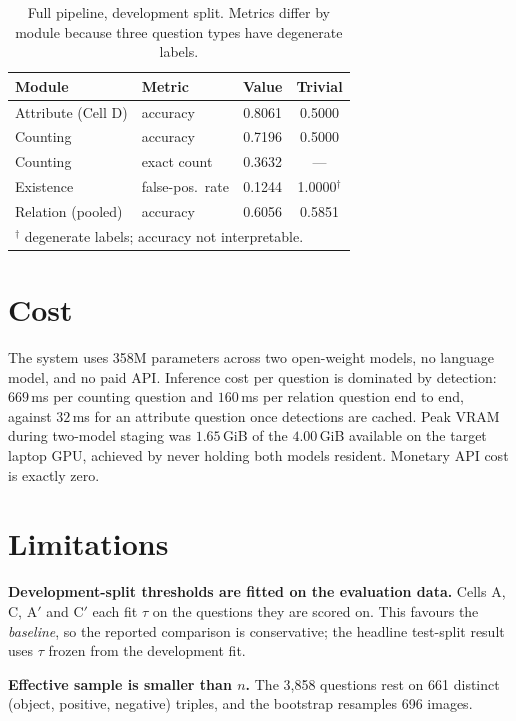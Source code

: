 \documentclass[conference]{IEEEtran}
\begin{document}
\begin{table}[t]
\caption{Full pipeline, development split. Metrics differ by module because three
question types have degenerate labels.}
\label{tab:pipeline}
\centering
\small
\begin{tabular}{llcc}
\toprule
\textbf{Module} & \textbf{Metric} & \textbf{Value} & \textbf{Trivial} \\
\midrule
Attribute (Cell D) & accuracy & 0.8061 & 0.5000 \\
Counting & accuracy & 0.7196 & 0.5000 \\
Counting & exact count & 0.3632 & --- \\
Existence & false-pos.\ rate & 0.1244 & 1.0000$^{\dagger}$ \\
Relation (pooled) & accuracy & 0.6056 & 0.5851 \\
\bottomrule
\multicolumn{4}{l}{\footnotesize $^{\dagger}$ degenerate labels; accuracy not interpretable.}
\end{tabular}
\end{table}

\section{Cost}

The system uses 358M parameters across two open-weight models, no language model,
and no paid API. Inference cost per question is dominated by detection: $669$\,ms per counting
question and $160$\,ms per relation question end to end, against $32$\,ms for an
attribute question once detections are cached. Peak VRAM during two-model
staging was $1.65$\,GiB of the $4.00$\,GiB available on the target laptop GPU,
achieved by never holding both models resident. Monetary API cost is exactly
zero.

\section{Limitations}

\textbf{Development-split thresholds are fitted on the evaluation data.} Cells A,
C, A$'$ and C$'$ each fit $\tau$ on the questions they are scored on. This
favours the \emph{baseline}, so the reported comparison is conservative; the
headline test-split result uses $\tau$ frozen from the development fit.

\textbf{Effective sample is smaller than $n$.} The 3{,}858 questions rest on 661
distinct (object, positive, negative) triples, and the bootstrap resamples 696
images.
\end{document}
